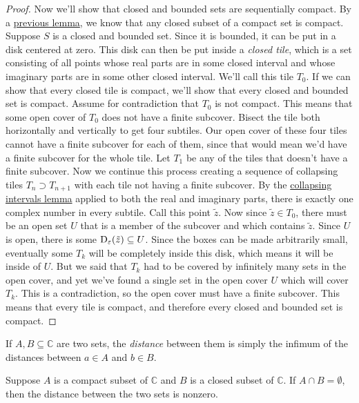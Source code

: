 \begin{proof}
Now we'll show that closed and bounded sets are sequentially compact. By a \hyperlink{Closed Subsets of Compact Sets}{previous lemma}, we know that any closed subset of a compact set is compact. Suppose $S$ is a closed and bounded set. Since it is bounded, it can be put in a disk centered at zero. This disk can then be put inside a \emph{closed tile}, which is a set consisting of all points whose real parts are in some closed interval and whose imaginary parts are in some other closed interval. We'll call this tile $T_0$. If we can show that every closed tile is compact, we'll show that every closed and bounded set is compact. Assume for contradiction that $T_0$ is not compact. This means that some open cover of $T_0$ does not have a finite subcover. Bisect the tile both horizontally and vertically to get four subtiles. Our open cover of these four tiles cannot have a finite subcover for each of them, since that would mean we'd have a finite subcover for the whole tile. Let $T_1$ be any of the tiles that doesn't have a finite subcover. Now we continue this process creating a sequence of collapsing tiles $T_n \supset T_{n+1}$ with each tile not having a finite subcover. By the \hyperlink{Collapsing Intervals Lemma}{collapsing intervals lemma} applied to both the real and imaginary parts, there is exactly one complex number in every subtile. Call this point $\tilde{z}$. Now since $\tilde{z} \in T_0$, there must be an open set $U$ that is a member of the subcover and which contains $\tilde{z}$. Since $U$ is open, there is some $\operatorname{D_{\varepsilon}} ({\tilde{z}}) \subseteq U$. Since the boxes can be made arbitrarily small, eventually some $T_k$ will be completely inside this disk, which means it will be inside of $U$. But we said that $T_k$ had to be covered by infinitely many sets in the open cover, and yet we've found a single set in the open cover $U$ which will cover $T_k$. This is a contradiction, so the open cover must have a finite subcover. This means that every tile is compact, and therefore every closed and bounded set is compact.
\end{proof}
\begin{definition}
If $A, B \subseteq \mathbb{C}$ are two sets, the \emph{distance} between them is simply the infimum of the distances between $a \in A$ and $b \in B$.
\end{definition}
\begin{theorem}
Suppose $A$ is a compact subset of $\mathbb{C}$ and $B$ is a closed subset of $\mathbb{C}$. If $A \cap B = \emptyset$, then the distance between the two sets is nonzero.
\end{theorem}
